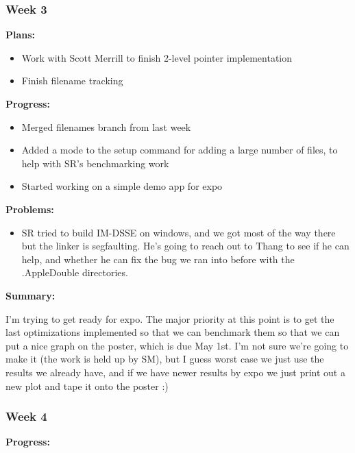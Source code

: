 \subsubsection{Week 3}

\noindent \textbf{Plans: }

\begin{itemize}
\item     Work with Scott Merrill to finish 2-level pointer implementation
\item     Finish filename tracking
\end{itemize}

\noindent \textbf{Progress: }

\begin{itemize}
\item     Merged filenames branch from last week

\item     Added a mode to the setup command for adding a large number of files, to help with SR's benchmarking work

\item     Started working on a simple demo app for expo
\end{itemize}

\noindent \textbf{Problems: }

\begin{itemize}
\item     SR tried to build IM-DSSE on windows, and we got most of the way there but the linker is segfaulting. He's going to reach out to Thang to see if he can help, and whether he can fix the bug we ran into before with the .AppleDouble directories.
\end{itemize}

\noindent \textbf{Summary: }

I'm trying to get ready for expo. The major priority at this point is to get the last optimizations implemented so that we can benchmark them so that we can put a nice graph on the poster, which is due May 1st. I'm not sure we're going to make it (the work is held up by SM), but I guess worst case we just use the results we already have, and if we have newer results by expo we just print out a new plot and tape it onto the poster :)


\subsubsection{Week 4}

\noindent \textbf{Progress: }

